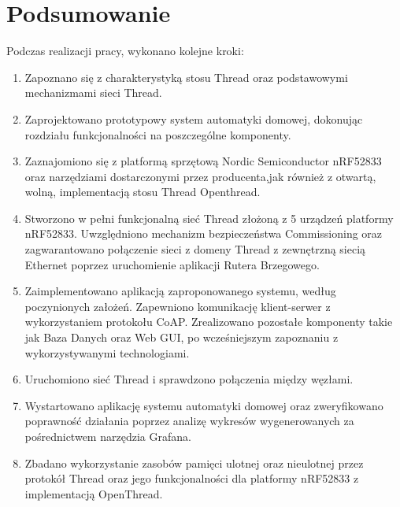 \section*{Podsumowanie}

Podczas realizacji pracy, wykonano kolejne kroki:
\begin{enumerate}
    \item Zapoznano się z charakterystyką stosu Thread oraz podstawowymi mechanizmami sieci Thread.
    \item Zaprojektowano prototypowy system automatyki domowej, dokonując rozdziału funkcjonalności na poszczególne komponenty.
    \item Zaznajomiono się z platformą sprzętową Nordic Semiconductor nRF52833 oraz narzędziami dostarczonymi przez producenta,jak również z otwartą, wolną, implementacją stosu Thread Openthread.
    \item Stworzono w pełni funkcjonalną sieć Thread złożoną z 5 urządzeń platformy nRF52833. Uwzględniono mechanizm bezpieczeństwa Commissioning oraz zagwarantowano połączenie sieci z domeny Thread z zewnętrzną siecią Ethernet poprzez uruchomienie aplikacji Rutera Brzegowego.
    \item Zaimplementowano aplikacją zaproponowanego systemu, według poczynionych założeń. Zapewniono komunikację klient-serwer z wykorzystaniem protokołu CoAP. Zrealizowano pozostałe komponenty takie jak Baza Danych oraz Web GUI, po wcześniejszym zapoznaniu z wykorzystywanymi technologiami.
    \item Uruchomiono sieć Thread i sprawdzono połączenia między węzłami.
    \item Wystartowano aplikację systemu automatyki domowej oraz zweryfikowano poprawność działania poprzez analizę wykresów wygenerowanych za pośrednictwem narzędzia Grafana.
    \item Zbadano wykorzystanie zasobów pamięci ulotnej oraz nieulotnej przez protokół Thread oraz jego funkcjonalności dla platformy nRF52833 z implementacją OpenThread.
\end{enumerate}

